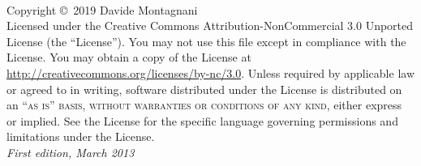\documentclass[11pt,fleqn]{book} %
\begin{document}

\begingroup
\thispagestyle{empty}
\vfill
\endgroup


\newpage
~\vfill
\thispagestyle{empty}

\noindent Copyright \copyright\ 2019 Davide Montagnani\\ %



\noindent Licensed under the Creative Commons Attribution-NonCommercial 3.0 Unported License (the ``License''). You may not use this file except in compliance with the License. You may obtain a copy of the License at \url{http://creativecommons.org/licenses/by-nc/3.0}. Unless required by applicable law or agreed to in writing, software distributed under the License is distributed on an \textsc{``as is'' basis, without warranties or conditions of any kind}, either express or implied. See the License for the specific language governing permissions and limitations under the License.\\ %

\noindent \textit{First edition, March 2013} %

% 
\end{document}
